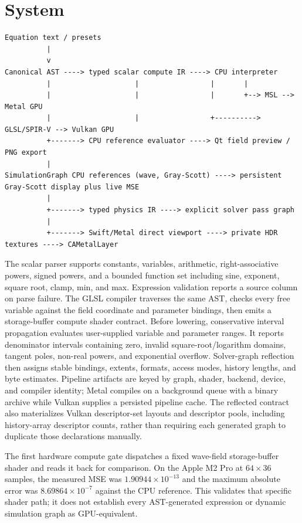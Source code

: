 \documentclass[10pt]{article}
\begin{document}
\section{System}

\begin{verbatim}
Equation text / presets
          |
          v
Canonical AST ----> typed scalar compute IR ----> CPU interpreter
          |                    |                 |       |
          |                    |                 |       +--> MSL --> Metal GPU
          |                    |                 +----------> GLSL/SPIR-V --> Vulkan GPU
          +-------> CPU reference evaluator ----> Qt field preview / PNG export
          |
SimulationGraph CPU references (wave, Gray-Scott) ----> persistent Gray-Scott display plus live MSE
          |
          +-------> typed physics IR ----> explicit solver pass graph
          |
          +-------> Swift/Metal direct viewport ----> private HDR textures ----> CAMetalLayer
\end{verbatim}

The scalar parser supports constants, variables, arithmetic, right-associative powers, signed
powers, and a bounded function set including sine, exponent, square root, clamp, min, and max.
Expression validation reports a source column on parse failure. The GLSL compiler traverses the
same AST, checks every free variable against the field coordinate and parameter bindings, then
emits a storage-buffer compute shader contract.
Before lowering, conservative interval propagation evaluates user-supplied variable and parameter
ranges. It reports denominator intervals containing zero, invalid square-root/logarithm domains,
tangent poles, non-real powers, and exponential overflow. Solver-graph reflection then assigns
stable bindings, extents, formats, access modes, history lengths, and byte estimates. Pipeline
artifacts are keyed by graph, shader, backend, device, and compiler identity; Metal compiles on a
background queue with a binary archive while Vulkan supplies a persisted pipeline cache. The
reflected contract also materializes Vulkan descriptor-set layouts and descriptor pools, including
history-array descriptor counts, rather than requiring each generated graph to duplicate those
declarations manually.

The first hardware compute gate dispatches a fixed wave-field storage-buffer shader and reads it
back for comparison. On the Apple M2 Pro at $64\times36$ samples, the measured MSE was
$1.90944\times10^{-13}$ and the maximum absolute error was $8.69864\times10^{-7}$ against the
CPU reference. This validates that specific shader path; it does not establish every AST-generated
expression or dynamic simulation graph as GPU-equivalent.
\end{document}
